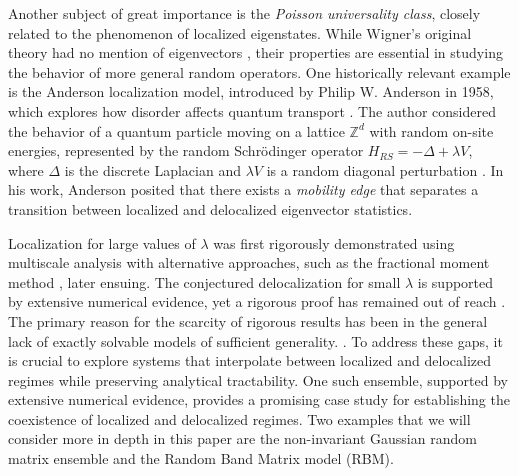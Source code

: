 \documentclass[11pt]{article}
\newcommand{\Z}{\mathbb{Z}}
\begin{document}
\vspace{0.5 cm}
\noindent Another subject of great importance is the \textit{Poisson universality class}, closely related to the phenomenon of localized eigenstates. While Wigner's original theory had no mention of eigenvectors \cite{7}, their properties are essential in studying the behavior of more general random operators. One historically relevant example is the Anderson localization model, introduced by Philip W. Anderson in 1958, which explores how disorder affects quantum transport \cite{anderson}. The author considered the behavior of a quantum particle moving on a lattice $\Z^d$ with random on-site energies, represented by the random Schrödinger operator \( H_{RS}=-\Delta + \lambda V \), where \( \Delta \) is the discrete Laplacian and \( \lambda V \) is a random diagonal perturbation \cite{randomoperators}. In his work, Anderson posited that there exists a \textit{mobility edge} that separates a transition between localized and delocalized eigenvector statistics. 
\vspace{0.5 cm}

\noindent Localization for large values of $\lambda$ was first rigorously demonstrated using multiscale analysis \cite{24} with alternative approaches, such as the fractional moment method \cite{1}, later ensuing. The conjectured delocalization for small $\lambda$ is supported by extensive numerical evidence, yet a rigorous proof has remained out of reach \cite{bandSDE}. The primary reason for the scarcity of rigorous results has been in the general lack of exactly solvable models of sufficient generality. \cite{kravtsov2009}.  To address these gaps, it is crucial to explore systems that interpolate between localized and delocalized regimes while preserving analytical tractability. One such ensemble, supported by extensive numerical evidence, provides a promising case study for establishing the coexistence of localized and delocalized regimes. Two examples that we will consider more in depth in this paper are the non-invariant Gaussian random matrix ensemble and the Random Band Matrix model (RBM).
\end{document}

